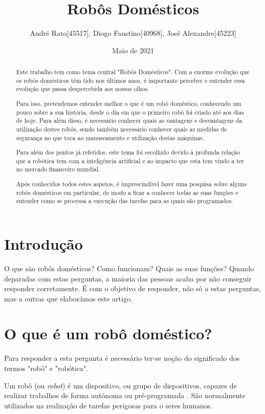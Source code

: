 \documentclass[10pt]{article}
\title{Robôs Domésticos}
\author{André Rato[45517], Diogo Faustino[40968], José Alexandre[45223]}
\date{Maio de 2021}
\begin{document}
\maketitle
\renewcommand\abstractname{Resumo}
\begin{abstract}

Este trabalho tem como tema central "Robôs Domésticos". Com a enorme evolução que os robôs domésticos têm tido nos últimos anos, é importante perceber e entender essa evolução que passa despercebida aos nossos olhos.

Para isso, pretendemos entender melhor o que é um robô doméstico, conhecendo um pouco sobre a sua história, desde o dia em que o primeiro robô foi criado até aos dias de hoje. Para além disso, é necessário conhecer quais as vantagens e desvantagens da utilização destes robôs, sendo também necessário conhecer quais as medidas de segurança no que toca ao manuseamento e utilização destas máquinas. 

Para além dos pontos já referidos, este tema foi escolhido devido à profunda relação que a robótica tem com a inteligência artificial e ao impacto que esta tem vindo a ter no mercado financeiro mundial.

Após conhecidos todos estes aspetos, é imprescindível fazer uma pesquisa sobre alguns robôs domésticos em particular, de modo a ficar a conhecer todas as suas funções e entender como se processa a execução das tarefas para as quais são programados.


\end{abstract}
\section{Introdução}
\hspace{\parindent}O que são robôs domésticos? Como funcionam? Quais as suas funções? Quando deparadas com estas perguntas, a maioria das pessoas acaba por não conseguir responder corretamente. É com o objetivo de responder, não só a estas perguntas, mas a outras que elaborámos este artigo. 

\section{O que é um robô doméstico?}
\hspace{\parindent}Para responder a esta pergunta é necessário ter-se noção do significado dos termos "robô" e "robótica".

Um robô (ou \textit{robot}) é um dispositivo, ou grupo de dispositivos, capazes de realizar trabalhos de forma autónoma ou pré-programada \cite{robot}. São normalmente utilizados na realização de tarefas perigosas para o seres humanos.
\end{document}
